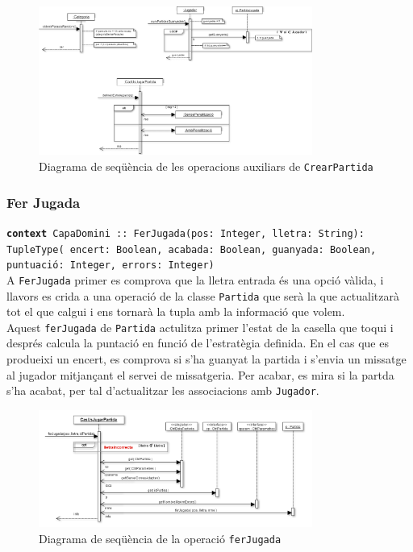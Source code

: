     \begin{figure}[h]
    \centering
    \includegraphics[width=0.8\textwidth]{figures/opsCrearPartida.png}
    \caption{Diagrama de seqüència de les operacions auxiliars de \texttt{CrearPartida}}
    \end{figure}

\subsubsection{Fer Jugada}
\small{\texttt{\textbf{context} CapaDomini :: FerJugada(pos: Integer, lletra: String): TupleType( encert: Boolean, acabada: Boolean, guanyada: Boolean, puntuació: Integer, errors: Integer)}} \\
A \texttt{FerJugada} primer es comprova que la lletra entrada és una opció vàlida, i llavors es crida a una operació de la classe \texttt{Partida} que serà la que actualitzarà tot el que calgui i ens tornarà la tupla amb la informació que volem.\\
Aquest \texttt{ferJugada} de \texttt{Partida} actulitza primer l'estat de la casella que toqui i després calcula la puntació en funció de l'estratègia definida. En el cas que es produeixi un encert, es comprova si s'ha guanyat la partida i s'envia un missatge al jugador mitjançant el servei de missatgeria. Per acabar, es mira si la partda s'ha acabat, per tal d'actualitzar les associacions amb \texttt{Jugador}.

    \begin{figure}[h]
    \centering
    \includegraphics[width=0.8\textwidth]{figures/ferJugada1.png}
    \caption{Diagrama de seqüència de la operació \texttt{ferJugada}}
    \end{figure}
    
